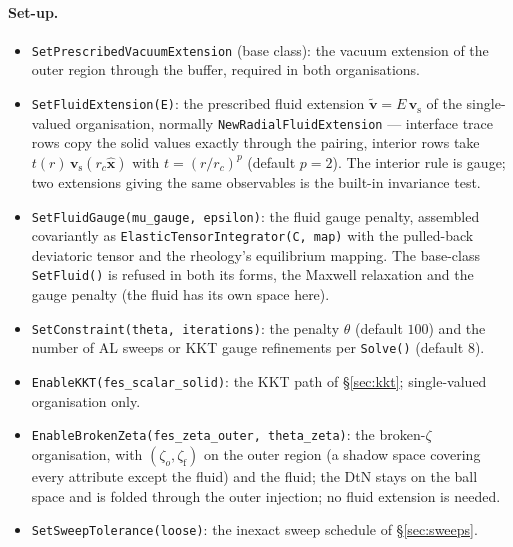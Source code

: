 \documentclass[11pt]{article}
\newcommand{\bv}{\mathbf{v}}
\newcommand{\bx}{\mathbf{x}}
\begin{document}
\paragraph{Set-up.}
\begin{itemize}
\item \texttt{SetPrescribedVacuumExtension} (base class): the vacuum
  extension of the outer region through the buffer, required in both
  organisations.
\item \texttt{SetFluidExtension(E)}: the prescribed fluid extension
  $\tilde{\bv} = E\,\bv_{\mathrm{s}}$ of the single-valued organisation,
  normally \texttt{NewRadialFluidExtension} --- interface trace rows copy
  the solid values exactly through the pairing, interior rows take
  $t(r)\,\bv_{\mathrm{s}}(r_c\hat{\bx})$ with $t = (r/r_c)^p$ (default
  $p = 2$). The interior rule is gauge; two extensions giving the same
  observables is the built-in invariance test.
\item \texttt{SetFluidGauge(mu\_gauge, epsilon)}: the fluid gauge
  penalty, assembled covariantly as
  \texttt{ElasticTensorIntegrator(C, map)} with the pulled-back
  deviatoric tensor and the rheology's equilibrium mapping. The
  base-class \texttt{SetFluid()} is refused in both its forms, the
  Maxwell relaxation and the gauge penalty (the fluid has its own
  space here).
\item \texttt{SetConstraint(theta, iterations)}: the penalty $\theta$
  (default $100$) and the number of AL sweeps or KKT gauge refinements
  per \texttt{Solve()} (default $8$).
\item \texttt{EnableKKT(fes\_scalar\_solid)}: the KKT path of
  \S\ref{sec:kkt}; single-valued organisation only.
\item \texttt{EnableBrokenZeta(fes\_zeta\_outer, theta\_zeta)}: the
  broken-$\zeta$ organisation, with $(\zeta_o, \zeta_{\mathrm{f}})$ on
  the outer region (a shadow space covering every attribute except the
  fluid) and the fluid; the DtN stays on the ball space and is folded
  through the outer injection; no fluid extension is needed.
\item \texttt{SetSweepTolerance(loose)}: the inexact sweep schedule of
  \S\ref{sec:sweeps}.
\end{itemize}
\end{document}
